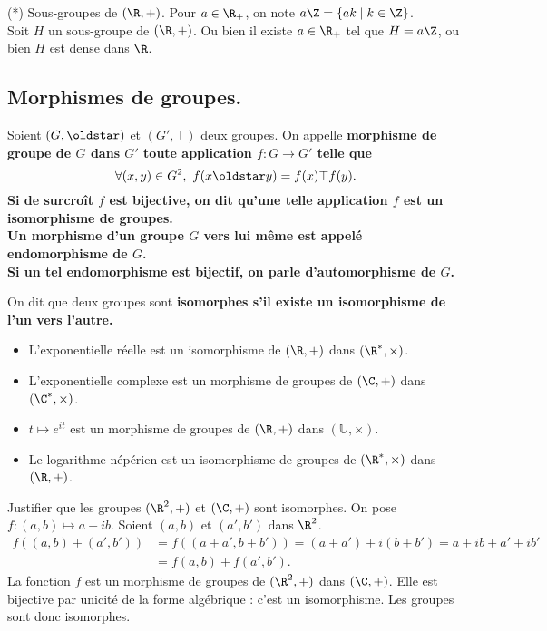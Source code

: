 \documentclass[11pt]{article}
\begin{document}
\begin{ex}{(*) Sous-groupes de $(\R,+)$.}{}
    Pour $a\in\R_+$, on note $a\Z=\{ak\mid k\in \Z\}$.\\
    Soit $H$ un sous-groupe de $(\R,+)$. Ou bien il existe $a\in\R_+$ tel que $H=a\Z$, ou bien $H$ est dense dans $\R$.
\end{ex}

\subsection{Morphismes de groupes.}

\begin{defi}{}{}
    Soient $(G,\s)$ et $(G',\top)$ deux groupes.\n
    On appelle \bf{morphisme de groupe} de $G$ dans $G'$ toute application $f:G\to G'$ telle que
    \begin{equation*}
        \forall (x,y)\in G^2, ~ f(x \s y) = f(x) \top f(y).
    \end{equation*}
    Si de surcroît $f$ est bijective, on dit qu'une telle application $f$ est un \bf{isomorphisme} de groupes.\\
    Un morphisme d'un groupe $G$ vers lui même est appelé \bf{endomorphisme} de $G$.\\
    Si un tel endomorphisme est bijectif, on parle d'\bf{automorphisme} de $G$.
\end{defi}

\begin{defi}{}{}
    On dit que deux groupes sont \bf{isomorphes} s'il existe un isomorphisme de l'un vers l'autre.
\end{defi}

\begin{ex}{}{}
    \begin{itemize}
        \item L'exponentielle réelle est un isomorphisme de $(\R,+)$ dans $(\R^*,\times)$.
        \item L'exponentielle complexe est un morphisme de groupes de $(\C,+)$ dans $(\C^*,\times)$.
        \item $t\mapsto e^{it}$ est un morphisme de groupes de $(\R,+)$ dans $(\mathbb{U},\times)$.
        \item Le logarithme népérien est un isomorphisme de groupes de $(\R^*,\times)$ dans $(\R,+)$.
    \end{itemize}
\end{ex}

\begin{ex}{}{}
    Justifier que les groupes $(\R^2,+)$ et $(\C,+)$ sont isomorphes.
    \tcblower
    On pose $f:(a,b)\mapsto a+ib$. Soient $(a,b)$ et $(a',b')$ dans $\R^2$.
    \begin{align*}
        f((a,b) + (a',b')) &= f((a+a',b+b')) = (a+a') + i(b+b') = a+ib + a'+ib' \\&= f(a,b) + f(a',b').
    \end{align*}
    La fonction $f$ est un morphisme de groupes de $(\R^2,+)$ dans $(\C,+)$.\n
    Elle est bijective par unicité de la forme algébrique : c'est un isomorphisme. Les groupes sont donc isomorphes.
\end{ex}
\end{document}
